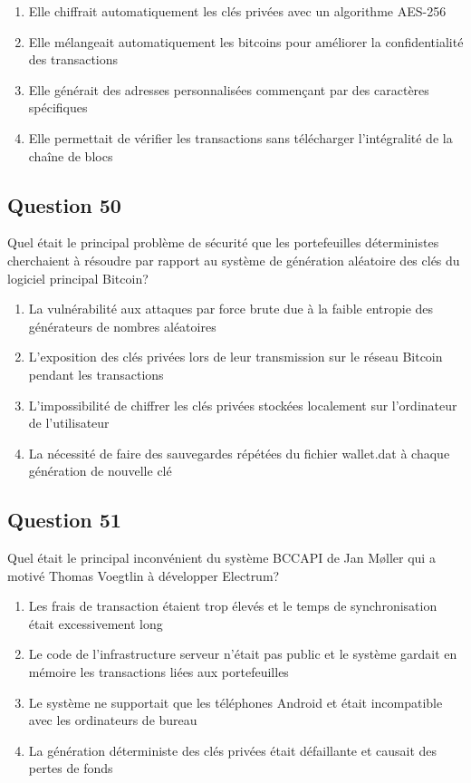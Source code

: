 \documentclass[12pt,a4paper]{article}
\begin{document}
\begin{enumerate}[label=\Alph*., leftmargin=*]
\item Elle chiffrait automatiquement les clés privées avec un algorithme AES-256
\item Elle mélangeait automatiquement les bitcoins pour améliorer la confidentialité des transactions
\item Elle générait des adresses personnalisées commençant par des caractères spécifiques
\item Elle permettait de vérifier les transactions sans télécharger l'intégralité de la chaîne de blocs
\end{enumerate}

\bigskip


\subsection*{Question 50}
Quel était le principal problème de sécurité que les portefeuilles déterministes cherchaient à résoudre par rapport au système de génération aléatoire des clés du logiciel principal Bitcoin?

\begin{enumerate}[label=\Alph*., leftmargin=*]
\item La vulnérabilité aux attaques par force brute due à la faible entropie des générateurs de nombres aléatoires
\item L'exposition des clés privées lors de leur transmission sur le réseau Bitcoin pendant les transactions
\item L'impossibilité de chiffrer les clés privées stockées localement sur l'ordinateur de l'utilisateur
\item La nécessité de faire des sauvegardes répétées du fichier wallet.dat à chaque génération de nouvelle clé
\end{enumerate}

\bigskip


\subsection*{Question 51}
Quel était le principal inconvénient du système BCCAPI de Jan Møller qui a motivé Thomas Voegtlin à développer Electrum?

\begin{enumerate}[label=\Alph*., leftmargin=*]
\item Les frais de transaction étaient trop élevés et le temps de synchronisation était excessivement long
\item Le code de l'infrastructure serveur n'était pas public et le système gardait en mémoire les transactions liées aux portefeuilles
\item Le système ne supportait que les téléphones Android et était incompatible avec les ordinateurs de bureau
\item La génération déterministe des clés privées était défaillante et causait des pertes de fonds
\end{enumerate}
\end{document}
